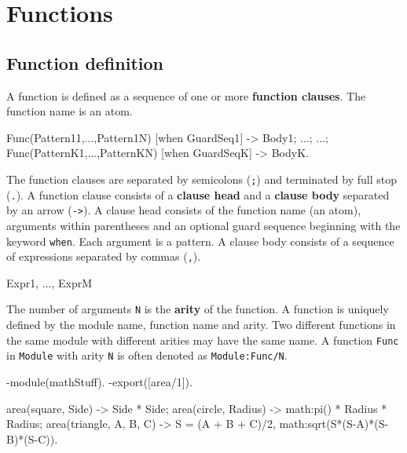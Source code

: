 \chapter{Functions}

\section{Function definition}
A function is defined as a sequence of one or more \textbf{function
clauses}. The function name is an atom.

\vspace*{4pt}
\begin{erlang}
Func(Pattern11,...,Pattern1N) [when GuardSeq1] -> Body1;
    ...;
    ...;
Func(PatternK1,...,PatternKN) [when GuardSeqK] -> BodyK.

\end{erlang}
\vspace*{4pt}

The function clauses are separated by semicolons (\texttt{;}) and
terminated by full stop (\texttt{.}). A function clause consists of a
\textbf{clause head} and a \textbf{clause body} separated by an arrow
(\texttt{->}). A clause head consists of the function name (an atom),
arguments within parentheses and an optional guard sequence beginning
with the keyword \texttt{when}.  Each argument is a pattern.  A clause
body consists of a sequence of expressions separated by commas
(\texttt{,}).

\vspace*{4pt}
\begin{erlang}
Expr1,
...,
ExprM
\end{erlang}
\vspace*{4pt}

The number of arguments \texttt{N} is the \textbf{arity} of the
function. A function is uniquely defined by the module name, function name
and arity. Two different functions in the same module with different
arities may have the same name. A function \texttt{Func} in \texttt{Module}
with arity \texttt{N} is often denoted as \texttt{Module:Func/N}.

\vspace*{4pt}
\begin{erlang}
-module(mathStuff).
-export([area/1]).

area({square, Side}) -> Side * Side;
area({circle, Radius}) -> math:pi() * Radius * Radius;
area({triangle, A, B, C}) ->
    S = (A + B + C)/2,
    math:sqrt(S*(S-A)*(S-B)*(S-C)).
\end{erlang}

